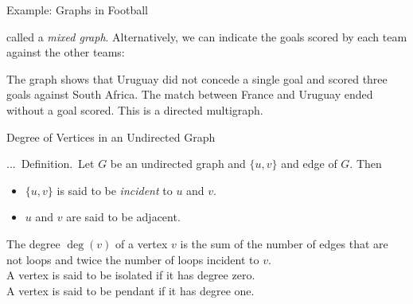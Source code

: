 \documentclass[smaller,hyperref={CJKbookmarks=true}]{beamer}
\newcounter{zhuo}[subsection]
\renewcommand{\thezhuo}{\thesection.\thesubsection.\arabic{zhuo}}
\newenvironment{DEFINITION}{\stepcounter{zhuo}\alert{\thezhuo.~Definition.\,}}{}
\begin{document}
\begin{frame}{Example: Graphs in Football}
\begin{spacing}{1.05}
called a \emph{mixed graph}.
\newpage
Alternatively, we can indicate the goals scored by each team against the
other teams:
\begin{center}
\end{center}
The graph shows that Uruguay did not concede a single goal and scored
three goals against South Africa. The match between France and Uruguay
ended without a goal scored. This is a directed multigraph.
\end{spacing}
\end{frame}
\begin{frame}[c]{Degree of Vertices in an Undirected Graph}
\begin{spacing}{1.2}
\begin{DEFINITION}
Let $G$ be an undirected graph and $\{u,v\}$ and edge of $G$. Then
\begin{itemize}
  \item $\{u,v\}$ is said to be \emph{incident} to $u$ and $v$.
  \item $u$ and $v$ are said to be adjacent.
\end{itemize}
The degree $\deg(v)$ of a vertex $v$ is the sum of the number of edges that are not loops and twice the number of loops incident to $v$.\\[5pt]
A vertex is said to be isolated if it has degree zero.\\[5pt]
A vertex is said to be pendant if it has degree one.\\[5pt]
\end{DEFINITION}
\end{spacing}
\end{frame}
\end{document}
